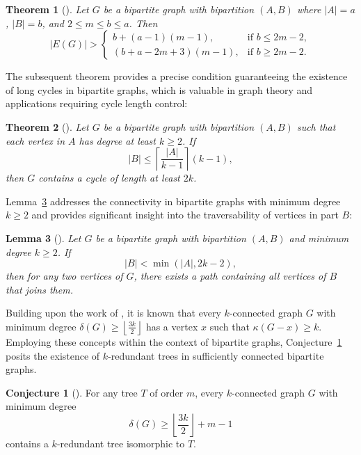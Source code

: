 \documentclass{article}
\newtheorem{theorem}{Theorem}[section]
\newtheorem{lemma}[theorem]{Lemma}
\theoremstyle{definition}
\newtheorem{conjecture}{Conjecture}[section]
\begin{document}
\begin{theorem}[\cite{B-Jackson}]\label{thm3Bipartite}
Let $G$ be a bipartite graph with bipartition $(A,B)$ where $|A|=a$, $|B|=b$, and $2 \leq m \leq b \leq a$. Then
\[
|E(G)| > 
\begin{cases}
b + (a - 1)(m - 1), & \text{if } b \leq 2m - 2, \\
(b + a - 2m + 3)(m - 1), & \text{if } b \geq 2m - 2.
\end{cases}
\]
\end{theorem}


The subsequent theorem provides a precise condition guaranteeing the existence of long cycles in bipartite graphs, which is valuable in graph theory and applications requiring cycle length control:

\begin{theorem}[\cite{B-Jackson}]
Let $G$ be a bipartite graph with bipartition $(A,B)$ such that each vertex in $A$ has degree at least $k \geq 2$. If
\[
|B| \leq \left\lceil \frac{|A|}{k-1} \right\rceil (k-1),
\]
then $G$ contains a cycle of length at least $2k$.
\end{theorem}

Lemma~\ref{lem2Bipartite} addresses the connectivity in bipartite graphs with minimum degree $k \geq 2$ and provides significant insight into the traversability of vertices in part $B$:

\begin{lemma}[\cite{B-Jackson}]\label{lem2Bipartite}
Let $G$ be a bipartite graph with bipartition $(A,B)$ and minimum degree $k \geq 2$. If
\[
|B| < \min(|A|, 2k-2),
\]
then for any two vertices of $G$, there exists a path containing all vertices of $B$ that joins them.
\end{lemma}

Building upon the work of \cite{Hong25YYWu}, it is known that every $k$-connected graph $G$ with minimum degree $\delta(G) \geq \left\lfloor \frac{3k}{2} \right\rfloor$ has a vertex $x$ such that $\kappa(G - x) \geq k$. Employing these concepts within the context of bipartite graphs, Conjecture~\ref{conjn1bipartite} posits the existence of $k$-redundant trees in sufficiently connected bipartite graphs.

\begin{conjecture}[\cite{Hong25YYWu}]\label{conjn1bipartite}
For any tree $T$ of order $m$, every $k$-connected graph $G$ with minimum degree
\[
\delta(G) \geq \left\lfloor \frac{3k}{2} \right\rfloor + m - 1
\]
contains a $k$-redundant tree isomorphic to $T$.
\end{conjecture}
\end{document}
